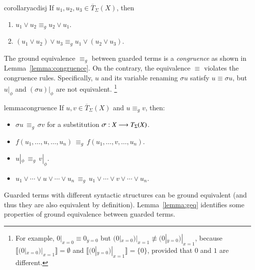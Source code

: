 \begin{restatable}{corollary}{acdisj}
  If $u_1, u_2, u_3 \in \overline{T}_{\Sigma}(X)$, then 
  \begin{enumerate}
	\item $u_1 \vee u_2 \equiv_g u_2 \vee u_1$.
  	\item $(u_1 \vee u_2) \vee u_3 \equiv_g u_1\vee (u_2 \vee u_3)$.
  \end{enumerate}

\end{restatable}


The ground equivalence $\equiv_g$ between guarded terms  is a \emph{congruence} as shown in
Lemma~\ref{lemma:congruence}. On the contrary, the equivalence
$\equiv$ violates the congruence rules.  Specifically, $u$ and its
variable renaming $\sigma u$ satisfy $u \equiv \sigma u$, but $u
|_\phi$ and $(\sigma u) |_\phi$ are not equivalent.%
\footnote{For example, $0 |_{x = 0}
\equiv 0_{y = 0}$ but $(0 |_{x = 0}) |_{x = 1} \not\equiv (0 |_{y =
  0}) |_{x = 1}$, because $\llbracket (0 |_{x = 0}) |_{x = 1}
\rrbracket = \emptyset$ and $\llbracket (0 |_{y = 0}) |_{x = 1}
\rrbracket = \{0\}$, provided that $0$ and $1$ are different.}

\begin{restatable}{lemma}{congruence}\label{lemma:congruence}
If $u,v \in \overline{T}_{\Sigma}(X)$ and $u \equiv_g v$, then:
\begin{itemize}
	\item $\sigma u \,\equiv_g\, \sigma v$ for a substitution $\sigma : X \longrightarrow T_\Sigma(X)$.		
	\item $f(u_1, \ldots, u, \ldots, u_n) \,\equiv_g\, f(u_1, \ldots, v, \ldots, u_n)$.
	\item $u |_\phi \,\equiv_g\, v |_\phi$.
	\item $u_1 \vee \cdots \vee u \vee \cdots \vee u_n \,\equiv_g\, u_1 \vee \cdots \vee v \vee \cdots \vee u_n$.
\end{itemize}
\end{restatable}


Guarded terms with different syntactic structures can be ground equivalent (and
thus they are also equivalent by definition).  Lemma~\ref{lemma:geq}
identifies some properties of ground equivalence between guarded
terms.



